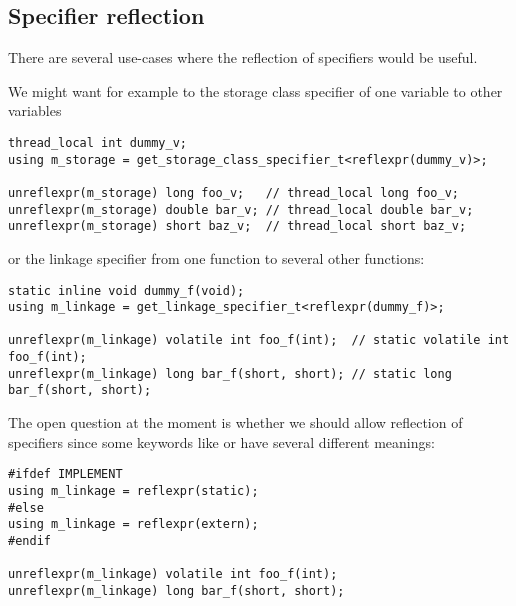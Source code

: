 \subsection{Specifier reflection}
\label{fut-specifiers}

There are several use-cases where the reflection of specifiers would
be useful.

We might want for example to  the storage class specifier of
one variable to other variables

\begin{verbatim}
thread_local int dummy_v;
using m_storage = get_storage_class_specifier_t<reflexpr(dummy_v)>;

unreflexpr(m_storage) long foo_v;   // thread_local long foo_v;
unreflexpr(m_storage) double bar_v; // thread_local double bar_v;
unreflexpr(m_storage) short baz_v;  // thread_local short baz_v;
\end{verbatim}

or the linkage specifier from one function
to several other functions:

\begin{verbatim}
static inline void dummy_f(void);
using m_linkage = get_linkage_specifier_t<reflexpr(dummy_f)>;

unreflexpr(m_linkage) volatile int foo_f(int);  // static volatile int foo_f(int);
unreflexpr(m_linkage) long bar_f(short, short); // static long bar_f(short, short);
\end{verbatim}

The open question at the moment is whether we should allow 
reflection of specifiers since some keywords like \verb@inline@ or \verb@virtual@
have several different meanings:

\begin{verbatim}
#ifdef IMPLEMENT
using m_linkage = reflexpr(static);
#else
using m_linkage = reflexpr(extern);
#endif

unreflexpr(m_linkage) volatile int foo_f(int);
unreflexpr(m_linkage) long bar_f(short, short);
\end{verbatim}

